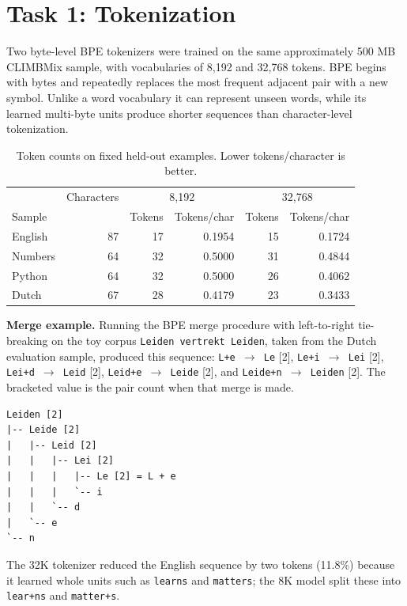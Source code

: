 \documentclass{article}
\begin{document}
\section{Task 1: Tokenization}

Two byte-level BPE tokenizers were trained on the same approximately 500 MB
CLIMBMix sample, with vocabularies of 8,192 and 32,768 tokens. BPE begins with
bytes and repeatedly replaces the most frequent adjacent pair with a new
symbol. Unlike a word vocabulary it can represent unseen words, while its
learned multi-byte units produce shorter sequences than character-level
tokenization.

\begin{table}[t]
\centering
\small
\caption{Token counts on fixed held-out examples. Lower tokens/character is better.}
\label{tab:tokenizer-compression}
\begin{tabular}{@{}lrrrrr@{}}
\toprule
& Characters & \multicolumn{2}{c}{8,192} & \multicolumn{2}{c}{32,768} \\
Sample & & Tokens & Tokens/char & Tokens & Tokens/char \\
\midrule
English & 87 & 17 & 0.1954 & 15 & 0.1724 \\
Numbers & 64 & 32 & 0.5000 & 31 & 0.4844 \\
Python & 64 & 32 & 0.5000 & 26 & 0.4062 \\
Dutch & 67 & 28 & 0.4179 & 23 & 0.3433 \\
\bottomrule
\end{tabular}
\end{table}

\textbf{Merge example.} Running the BPE merge procedure with left-to-right
tie-breaking on the toy corpus \texttt{Leiden vertrekt Leiden}, taken from the
Dutch evaluation sample, produced this sequence:
\texttt{L+e $\rightarrow$ Le} [2],
\texttt{Le+i $\rightarrow$ Lei} [2],
\texttt{Lei+d $\rightarrow$ Leid} [2],
\texttt{Leid+e $\rightarrow$ Leide} [2], and
\texttt{Leide+n $\rightarrow$ Leiden} [2]. The bracketed value is the pair
count when that merge is made.

\begin{verbatim}
Leiden [2]
|-- Leide [2]
|   |-- Leid [2]
|   |   |-- Lei [2]
|   |   |   |-- Le [2] = L + e
|   |   |   `-- i
|   |   `-- d
|   `-- e
`-- n
\end{verbatim}

The 32K tokenizer reduced the English sequence by two tokens (11.8\%) because
it learned whole units such as \texttt{learns} and \texttt{matters}; the 8K
model split these into \texttt{lear+ns} and \texttt{matter+s}.
\end{document}
